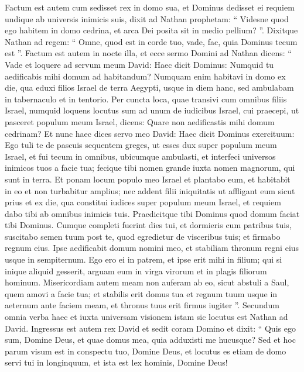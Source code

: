 \begin{biblechapter}
\begin{biblechapter}
\begin{biblechapter}
\begin{biblechapter}
\begin{biblechapter}
\begin{biblechapter}
\begin{biblechapter}
\verse Factum est autem cum sedisset rex in domo sua, et Dominus dedisset ei requiem undique ab universis inimicis suis, 
\verse dixit ad Nathan prophetam: “ Videsne quod ego habitem in domo cedrina, et arca Dei posita sit in medio pellium? ”. 
\verse Dixitque Nathan ad regem: “ Omne, quod est in corde tuo, vade, fac, quia Dominus tecum est ”.
 \verse Factum est autem in nocte illa, et ecce sermo Domini ad Nathan dicens: 
\verse “ Vade et loquere ad servum meum David: Haec dicit Dominus: Numquid tu aedificabis mihi domum ad habitandum? 
\verse Numquam enim habitavi in domo ex die, qua eduxi filios Israel de terra Aegypti, usque in diem hanc, sed ambulabam in tabernaculo et in tentorio. 
\verse Per cuncta loca, quae transivi cum omnibus filiis Israel, numquid loquens locutus sum ad unum de iudicibus Israel, cui praecepi, ut pasceret populum meum Israel, dicens: Quare non aedificastis mihi domum cedrinam? 
\verse Et nunc haec dices servo meo David: Haec dicit Dominus exercituum: Ego tuli te de pascuis sequentem greges, ut esses dux super populum meum Israel, 
\verse et fui tecum in omnibus, ubicumque ambulasti, et interfeci universos inimicos tuos a facie tua; fecique tibi nomen grande iuxta nomen magnorum, qui sunt in terra. 
\verse Et ponam locum populo meo Israel et plantabo eum, et habitabit in eo et non turbabitur amplius; nec addent filii iniquitatis ut affligant eum sicut prius 
\verse et ex die, qua constitui iudices super populum meum Israel, et requiem dabo tibi ab omnibus inimicis tuis. Praedicitque tibi Dominus quod domum faciat tibi Dominus. 
\verse Cumque completi fuerint dies tui, et dormieris cum patribus tuis, suscitabo semen tuum post te, quod egredietur de visceribus tuis; et firmabo regnum eius. 
\verse Ipse aedificabit domum nomini meo, et stabiliam thronum regni eius usque in sempiternum. 
\verse Ego ero ei in patrem, et ipse erit mihi in filium; qui si inique aliquid gesserit, arguam eum in virga virorum et in plagis filiorum hominum. 
\verse Misericordiam autem meam non auferam ab eo, sicut abstuli a Saul, quem amovi a facie tua; 
\verse et stabilis erit domus tua et regnum tuum usque in aeternum ante faciem meam, et thronus tuus erit firmus iugiter ”.
 \verse Secundum omnia verba haec et iuxta universam visionem istam sic locutus est Nathan ad David.
 \verse Ingressus est autem rex David et sedit coram Domino et dixit: “ Quis ego sum, Domine Deus, et quae domus mea, quia adduxisti me hucusque? 
\verse Sed et hoc parum visum est in conspectu tuo, Domine Deus, et locutus es etiam de domo servi tui in longinquum, et ista est lex hominis, Domine Deus! 

\end{biblechapter}
\end{biblechapter}
\end{biblechapter}
\end{biblechapter}
\end{biblechapter}
\end{biblechapter}
\end{biblechapter}
